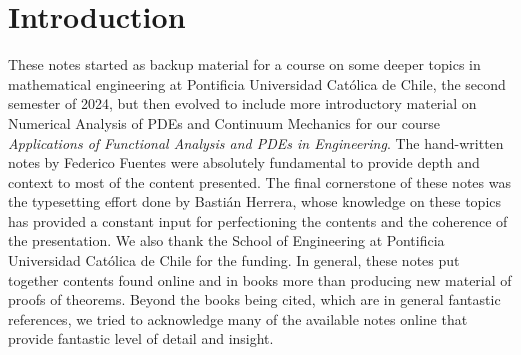 \section*{Introduction}

These notes started as backup material for a course on some deeper topics in mathematical engineering at Pontificia Universidad Católica de Chile, the second semester of 2024, but then evolved to include more introductory material on Numerical Analysis of PDEs and Continuum Mechanics for our course \emph{Applications of Functional Analysis and PDEs in Engineering}. The hand-written notes by Federico Fuentes were absolutely fundamental to provide depth and context to most of the content presented. The final cornerstone of these notes was the typesetting effort done by Bastián Herrera, whose knowledge on these topics has provided a constant input for perfectioning the contents and the coherence of the presentation. We also thank the School of Engineering at Pontificia Universidad Católica de Chile for the funding. In general, these notes put together contents found online and in books more than producing new material of proofs of theorems. Beyond the books being cited, which are in general fantastic references, we tried to acknowledge many of the available notes online that provide fantastic level of detail and insight.

